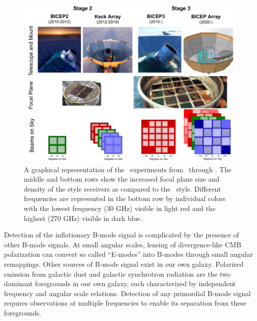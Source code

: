\documentclass[]{spie}  %
\begin{document}
\begin{figure}[h]
	\center
	\includegraphics[scale=0.5]{progression.pdf}
	\caption{A graphical representation of the \bk\ experiments from
	\ through \biceparray. The middle and bottom rows show the increased focal plane size and density of the  style receivers as compared to the \ style. Different
	frequencies are represented in the bottom row by individual colors with the lowest frequency
	(30 GHz) visible in light red and the highest (270 GHz) visible in dark
	blue.}
	\label{fig:progression}
\end{figure}

Detection of the inflationary B-mode signal is complicated by the presence of
other B-mode signals. At small angular scales, lensing of divergence-like CMB
polarization can convert so called ``E-modes'' into B-modes through small
angular remappings. Other sources of B-mode signal exist in our own galaxy.
Polarized emission from galactic dust and galactic synchrotron radiation are
the two dominant foregrounds in our own galaxy, each characterized by
independent frequency and angular scale relations. Detection of any primordial
B-mode signal requires observations at multiple frequencies to enable its
separation from these foregrounds. 
\end{document}
